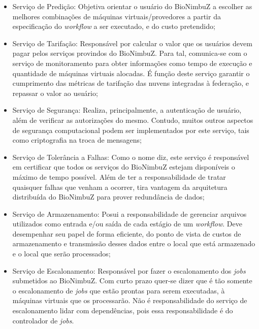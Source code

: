 	\begin{itemize}
		\item Serviço de Predição: Objetiva orientar o usuário do BioNimbuZ a escolher as melhores combinações de máquinas virtuais/provedores a partir da especificação do \textit{workflow} a ser executado, e do custo pretendido;
		\item Serviço de Tarifação: Responsável por calcular o valor que os usuários devem pagar pelos serviços provindos do BioNimbuZ. Para tal, comunica-se com o serviço de monitoramento para obter informações como tempo de execução e quantidade de máquinas virtuais alocadas. É função deste serviço garantir o cumprimento das métricas de tarifação das nuvens integradas à federação, e repassar o valor ao usuário;
		\item Serviço de Segurança: Realiza, principalmente, a autenticação de usuário, além de verificar as autorizações do mesmo. Contudo, muitos outros aspectos de segurança computacional podem ser implementados por este serviço, tais como criptografia na troca de mensagens;
		\item Serviço de Tolerância a Falhas: Como o nome diz, este serviço é responsável em certificar que todos os serviços do BioNimbuZ estejam disponíveis o máximo de tempo possível. Além de ter a responsabilidade de tratar quaisquer falhas que venham a ocorrer, tira vantagem da arquitetura distribuída do BioNimbuZ para prover redundância de dados;
		\item Serviço de Armazenamento: Posui a responsabilidade de gerenciar arquivos utilizados como entrada e/ou saída de cada estágio de um \textit{workflow}. Deve desempenhar seu papel de forma eficiente, do ponto de vista de custos de armazenamento e transmissão desses dados entre o local que está armazenado e o local que serão processados;
		\item Serviço de Escalonamento: Responsável por fazer o escalonamento dos \textit{jobs} submetidos ao BioNimbuZ. Com curto prazo quer-se dizer que é tão somente o escalonamento de \textit{jobs} que estão prontas para serem executadas, à máquinas virtuais que os processarão. Não é responsabilidade do serviço de escalonamento lidar com dependências, pois essa responsabilidade é do controlador de \textit{jobs}.
	

\end{itemize}
